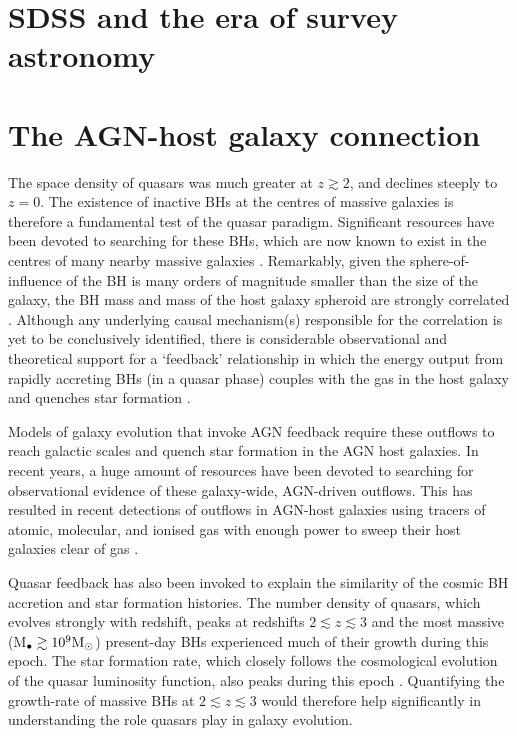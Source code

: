 \section{SDSS and the era of survey astronomy}


\section{The AGN-host galaxy connection}

The space density of quasars was much greater at $z\gtrsim2$, and declines steeply to $z=0$. 
The existence of inactive BHs at the centres of massive galaxies is therefore a fundamental test of the quasar paradigm. 
Significant resources have been devoted to searching for these BHs, which are now known to exist in the centres of many nearby massive galaxies \citep[e.g.][]{kormendy95,ferrarese05,kormendy13}.
Remarkably, given the sphere-of-influence of the BH is many orders of magnitude smaller than the size of the galaxy, the BH mass and mass of the host galaxy spheroid are strongly correlated \citep{ferrarese00,gebhardt00,graham01,tremaine02,marconi03,aller07,gultekin09}.  
Although any underlying causal mechanism(s) responsible for the correlation is yet to be conclusively identified, there is considerable observational and theoretical support for a `feedback' relationship in which the energy output from rapidly accreting BHs (in a quasar phase) couples with the gas in the host galaxy and quenches star formation \citep[e.g.][]{silk98,king03,dimatteo05,king15}. 

Models of galaxy evolution that invoke AGN feedback require these outflows to reach galactic scales and quench star formation in the AGN host galaxies. 
In recent years, a huge amount of resources have been devoted to searching for observational evidence of these galaxy-wide, AGN-driven outflows. 
This has resulted in recent detections of outflows in AGN-host galaxies using tracers of atomic, molecular, and ionised gas with enough power to sweep their host galaxies clear of gas \citep[e.g.][]{nesvadba06,arav08,nesvadba08,moe09,dunn10,alexander10,harrison12,harrison14,nesvadba10,rupke13,veilleux13,nardini15,feruglio10,alatalo11,cimatti13,cicone14}.  

Quasar feedback has also been invoked to explain the similarity of the cosmic BH accretion and star formation histories.
The number density of quasars, which evolves strongly with redshift, peaks at redshifts $2 \lesssim z \lesssim 3$ \citep[e.g.][]{brandt05,richards06b} and the most massive (M$_\bullet \gtrsim 10^9{{{\rm M_\odot}}}$) present-day BHs experienced much of their growth during this epoch.  
The star formation rate, which closely follows the cosmological evolution of the quasar luminosity function, also peaks during this epoch \citep[e.g.][]{boyle98}. 
Quantifying the growth-rate of massive BHs at $2 \lesssim z \lesssim 3$ would therefore help significantly in understanding the role quasars play in galaxy evolution.


